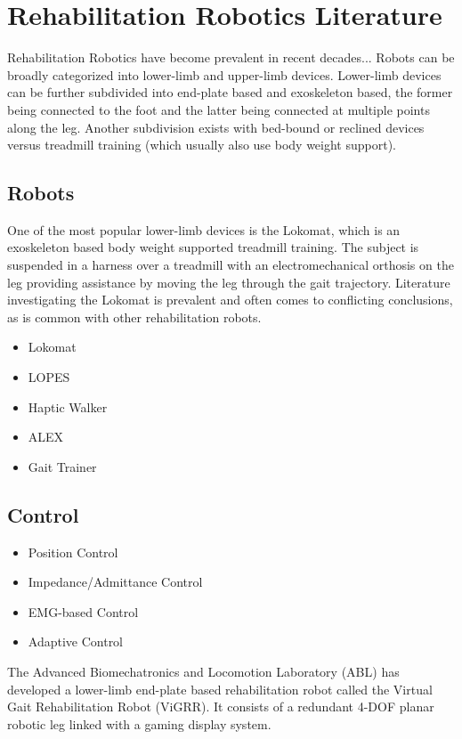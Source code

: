 \documentclass[12pt]{report}
\begin{document}
	\section{Rehabilitation Robotics Literature}
	
	Rehabilitation Robotics have become prevalent in recent decades... Robots can be broadly categorized into lower-limb and upper-limb devices. Lower-limb devices can be further subdivided into end-plate based and exoskeleton based, the former being connected to the foot and the latter being connected at multiple points along the leg. Another subdivision exists with bed-bound or reclined devices versus treadmill training (which usually also use body weight support). 
	
	\subsection{Robots}
	One of the most popular lower-limb devices is the Lokomat, which is an exoskeleton based body weight supported treadmill training. The subject is suspended in a harness over a treadmill with an electromechanical orthosis on the leg providing assistance by moving the leg through the gait trajectory. Literature investigating the Lokomat is prevalent and often comes to conflicting conclusions, as is common with other rehabilitation robots. 
	
	\begin{itemize}
		\item Lokomat
		\item LOPES
		\item Haptic Walker 
		\item ALEX
		\item Gait Trainer
	\end{itemize}

	
	\subsection{Control}
	
	\begin{itemize}
		\item Position Control
		\item Impedance/Admittance Control
		\item EMG-based Control
		\item Adaptive Control 
	\end{itemize}
	\cite{Meng2015}
	
	The Advanced Biomechatronics and Locomotion Laboratory (ABL) has developed a lower-limb end-plate based rehabilitation robot called the Virtual Gait Rehabilitation Robot (ViGRR). It consists of a redundant 4-DOF planar robotic leg linked with a gaming display system. \cite{Chisholm2010}
	
\end{document}
